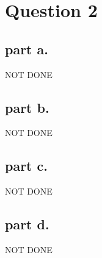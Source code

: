 \section{Question 2}

\subsection{part a.}
NOT DONE

\subsection{part b.}
NOT DONE

\subsection{part c.}
NOT DONE

\subsection{part d.}
NOT DONE

